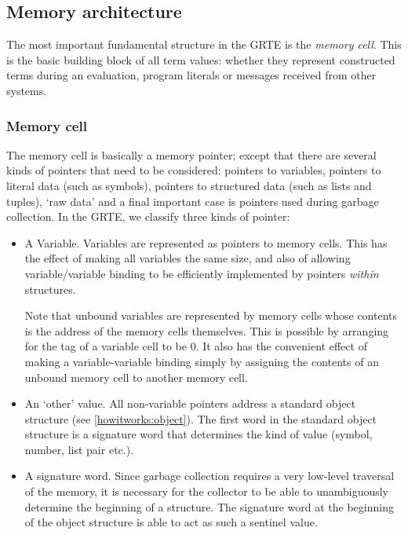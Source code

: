 \subsection{Memory architecture}
\label{howitworks:memory}

The most important fundamental structure in the GRTE is the \emph{memory cell}. This is the basic building block of all term values: whether they represent constructed terms during an evaluation, program literals or messages received from other \go systems.

\subsubsection{Memory cell}
\label{howitworks:memorycell}

The memory cell is basically a memory pointer; except that there are several kinds of pointers that need to be considered: pointers to variables, pointers to literal data (such as symbols), pointers to structured data (such as lists and tuples), `raw data' and a final important case is pointers used during garbage collection. In the GRTE, we classify three kinds of pointer:
\begin{itemize}
\item
A Variable. Variables are represented as pointers to memory cells. This has the effect of making all variables the same size, and also of allowing variable/variable binding to be efficiently implemented by pointers \emph{within} structures.

Note that unbound variables are represented by memory cells whose contents is the address of the memory cells themselves. This is possible by arranging for the tag of a variable cell to be 0. It also has the convenient effect of making a variable-variable binding simply by assigning the contents of an unbound memory cell to another memory cell.

\item
An `other' value. All non-variable pointers address a standard object structure (see \vref{howitworks:object}). The first word in the standard object structure is a signature word that determines the kind of value (symbol, number, list pair etc.).
\item
A signature word. Since garbage collection requires a very low-level traversal of the memory, it is necessary for the collector to be able to unambiguously determine the beginning of a structure. The signature word at the beginning of the object structure is able to act as such a sentinel value.
\end{itemize}

